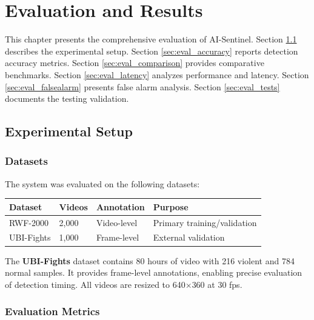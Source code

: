 
\chapter{Evaluation and Results}
\label{ch:evaluation}

This chapter presents the comprehensive evaluation of AI-Sentinel. Section \ref{sec:eval_setup} describes the experimental setup. Section \ref{sec:eval_accuracy} reports detection accuracy metrics. Section \ref{sec:eval_comparison} provides comparative benchmarks. Section \ref{sec:eval_latency} analyzes performance and latency. Section \ref{sec:eval_falsealarm} presents false alarm analysis. Section \ref{sec:eval_tests} documents the testing validation.

\section{Experimental Setup}
\label{sec:eval_setup}

\subsection{Datasets}

The system was evaluated on the following datasets:

\begin{longtable}{|p{2.5cm}|p{2cm}|p{2.5cm}|p{2.5cm}|}
    \hline
    \textbf{Dataset} & \textbf{Videos} & \textbf{Annotation} & \textbf{Purpose} \\
    \hline
    \hline
    RWF-2000 & 2,000 & Video-level & Primary training/validation \\
    \hline
    UBI-Fights & 1,000 & Frame-level & External validation \\
    \hline
\end{longtable}

The \textbf{UBI-Fights} dataset contains 80 hours of video with 216 violent and 784 normal samples. It provides frame-level annotations, enabling precise evaluation of detection timing. All videos are resized to 640$\times$360 at 30 fps.

\subsection{Evaluation Metrics}

